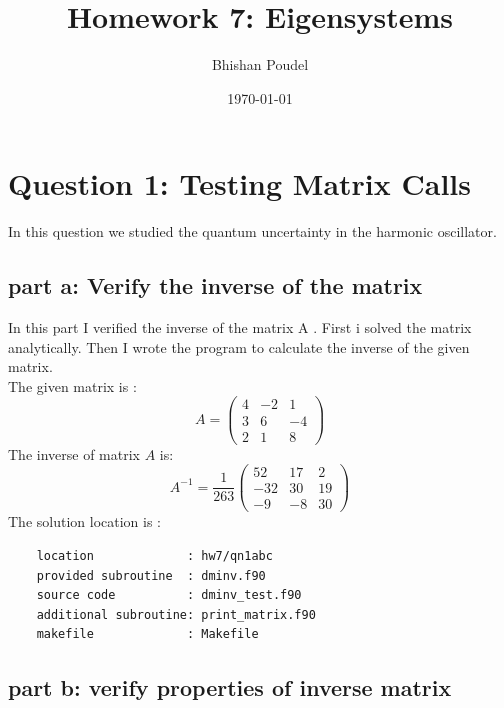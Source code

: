 \documentclass[11pt,a4paper,english]{article}
\title{Homework 7: Eigensystems}
\author{Bhishan Poudel}
\date{\today}
\newcommand{\bdm}{\begin{displaymath}}
\newcommand{\edm}{\end{displaymath}}
\begin{document}
\maketitle
\tableofcontents
\listoffigures
\clearpage


\section{Question 1: Testing Matrix Calls}
In this question we studied the quantum uncertainty in the harmonic oscillator.\\

	
	\subsection{part a: Verify the inverse of the matrix}
	
	In this part I verified the inverse of the matrix A .
	First i solved the matrix analytically.
	Then I wrote the program to calculate the inverse of the given matrix.\\
	The given matrix is :\\
    \begin{displaymath}
      A=
  		\begin{pmatrix}
    			4 & -2 & 1 \\
    			3 &  6 & -4 \\
    			2 &  1 &  8 
  		\end{pmatrix}
	\end{displaymath}
	The inverse of matrix $A$ is:\\
	\bdm
	 A^{-1} = \frac{1}{263} 	      
  		\begin{pmatrix}
    			52 & 17 & 2 \\
    		   -32 & 30 & 19 \\
    		   -9  & -8 & 30 
  		\end{pmatrix}
	\edm
	The solution location is :\\
	\begin{verbatim}
	location             : hw7/qn1abc
	provided subroutine  : dminv.f90
	source code          : dminv_test.f90
	additional subroutine: print_matrix.f90
	makefile             : Makefile
	\end{verbatim}
	
	\subsection{part b: verify properties of inverse matrix}
	
\end{document}
